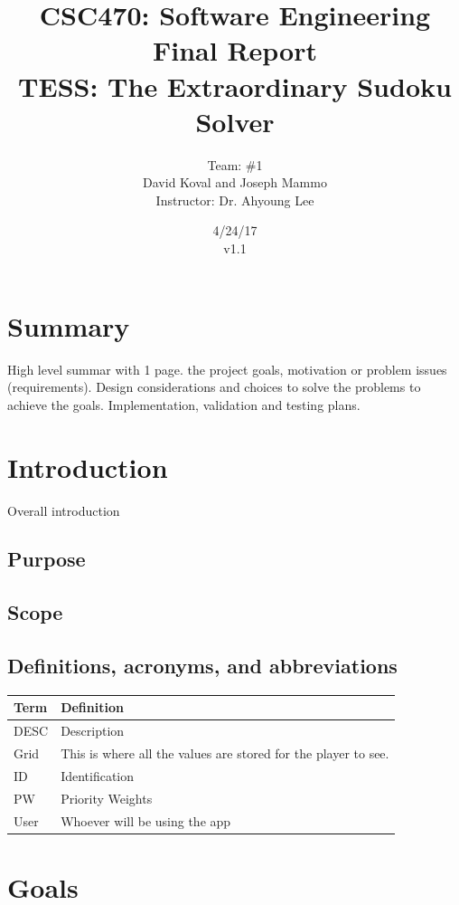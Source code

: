 \documentclass{article}
\title{CSC470: Software Engineering Final Report\\ TESS: The Extraordinary Sudoku Solver}
\author{Team: \#1 \\David Koval and Joseph Mammo\\Instructor: Dr. Ahyoung Lee}
\date{ 4/24/17 \\ v1.1 }
\begin{document}
 
\maketitle

\clearpage

\tableofcontents

\clearpage

\section{Summary} 
\todo{!!!} High level summar with 1 page. the project goals, motivation or problem issues (requirements). Design considerations and choices to solve the problems to achieve the goals. Implementation, validation and testing plans.


 
\section{Introduction}
 
Overall introduction
\subsection{Purpose}
\subsection{Scope}
\subsection{Definitions, acronyms, and abbreviations}

\begin{tabular}{ | m{8em} | m{24em}|  } 
\hline
\textbf{Term}& \textbf{Definition}  \\ 
\hline
DESC & Description  \\ 
\hline
Grid & This is where all the values are stored for the player to see.  \\ 
\hline
ID & Identification  \\ 
\hline
PW & Priority Weights  \\ 
\hline
User & Whoever will be using the app  \\ 
\hline
\end{tabular}

 

\section{Goals}
\end{document}
